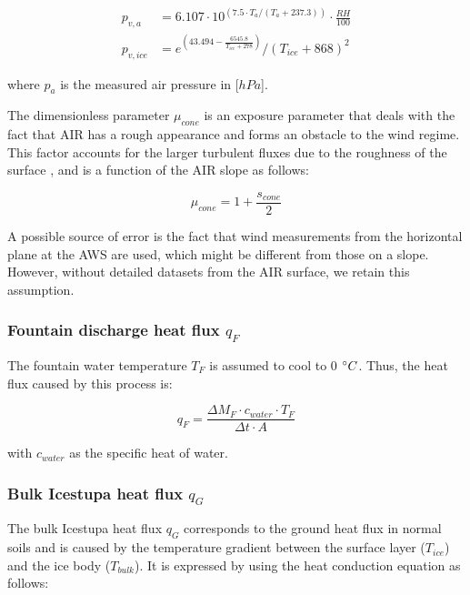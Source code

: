 \documentclass[utf8]{frontiersSCNS} %
\begin{document}
\begin{equation}
	\begin{split}
		p_{v,a}&=6.107 \cdot 10^{(7.5 \cdot T_a / (T_a + 237.3))} \cdot \frac{RH}{100}\\
		p_{v,ice}&=e^{(43.494 - \frac{6545.8}{T_{ice} + 278})}/(T_{ice} + 868)^2
	\end{split} \label{eqn:vp}
\end{equation}

where $p_{a}$ is the measured air pressure in [$hPa$].

The dimensionless parameter $\mu_{cone}$ is an exposure parameter that deals with the fact that AIR has a rough
appearance and forms an obstacle to the wind regime. This factor accounts for the larger turbulent fluxes due to
the roughness of the surface \citep{Oerlemans_2021}, and is a function of the AIR slope as follows:

\begin{equation}
	\mu_{cone} = 1 + \frac{s_{cone}}{2}
\end{equation}

A possible source of error is the fact that wind measurements from the horizontal plane at the AWS are used,
which might be different from those on a slope. However, without detailed datasets from the AIR surface, we
retain this assumption.

\subsubsection{Fountain discharge heat flux \texorpdfstring{$q_{F}$}{Lg} }

The fountain water temperature $T_F$ is assumed to cool to 0 $\degree C$. Thus, the heat flux caused by this
process is:

\begin{equation}
	q_{F} = \frac{ \Delta M_F \cdot c_{water} \cdot T_F}{\Delta t \cdot A}
	\label{eqn:qF}
\end{equation}

with $c_{water}$ as the specific heat of water.

\subsubsection{Bulk Icestupa heat flux \texorpdfstring{$q_{G}$}{Lg}} \label{sec:Bulkflux}

The bulk Icestupa heat flux $q_{G}$ corresponds to the ground heat flux in normal soils and is caused by the
temperature gradient between the surface layer ($T_{ice}$) and the ice body ($T_{bulk}$). It is expressed by
using the heat conduction equation as follows:
\end{document}
